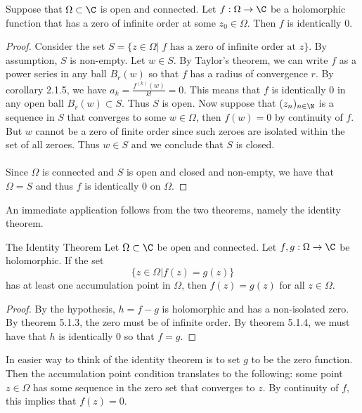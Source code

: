\documentclass[a4paper]{article}
\begin{document}
\begin{thm}{}{} Suppose that $\Omega\subset\C$ is open and connected. Let $f:\Omega\to\C$ be a holomorphic function that has a zero of infinite order at some $z_0\in\Omega$. Then $f$ is identically $0$. \tcbline
\begin{proof}
Consider the set $S=\{z\in\Omega|\; f\text{ has a zero of infinite order at }z\}$. By assumption, $S$ is non-empty. Let $w\in S$. By Taylor's theorem, we can write $f$ as a power series in any ball $B_r(w)$ so that $f$ has a radius of convergence $r$. By corollary 2.1.5, we have $a_k=\frac{f^{(k)}(w)}{k!}=0$. This means that $f$ is identically $0$ in any open ball $B_r(w)\subset S$. Thus $S$ is open. Now suppose that $(z_n)_{n\in\N}$ is a sequence in $S$ that converges to some $w\in\Omega$, then $f(w)=0$ by continuity of $f$. But $w$ cannot be a zero of finite order since such zeroes are isolated within the set of all zeroes. Thus $w\in S$ and we conclude that $S$ is closed. \\~\\

Since $\Omega$ is connected and $S$ is open and closed and non-empty, we have that $\Omega=S$ and thus $f$ is identically $0$ on $\Omega$. 
\end{proof}
\end{thm}

An immediate application follows from the two theorems, namely the identity theorem. 

\begin{thm}{The Identity Theorem}{} Let $\Omega\subset\C$ be open and connected. Let $f,g:\Omega\to\C$ be holomorphic. If the set $$\{z\in\Omega|f(z)=g(z)\}$$ has at least one accumulation point in $\Omega$, then $f(z)=g(z)$ for all $z\in\Omega$. \tcbline
\begin{proof}
By the hypothesis, $h=f-g$ is holomorphic and has a non-isolated zero. By theorem 5.1.3, the zero must be of infinite order. By theorem 5.1.4, we must have that $h$ is identically $0$ so that $f=g$. 
\end{proof}
\end{thm}

In easier way to think of the identity theorem is to set $g$ to be the zero function. Then the accumulation point condition translates to the following: some point $z\in\Omega$ has some sequence in the zero set that converges to $z$. By continuity of $f$, this implies that $f(z)=0$. \\~\\
\end{document}
